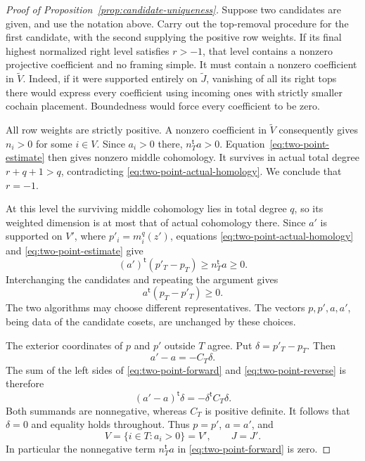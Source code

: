 \begin{proof}[Proof of Proposition~\ref{prop:candidate-uniqueness}]
Suppose two candidates are given, and use the notation above.  Carry
out the top-removal procedure for the first candidate, with the
second supplying the positive row weights.  If its final highest
normalized right level satisfies \(r>-1\), that level contains a
nonzero projective coefficient and no framing simple.  It must
contain a nonzero coefficient in \(\widetilde V\).  Indeed, if it
were supported entirely on \(\widetilde J\), vanishing of all its
right tops there would express every coefficient using incoming
ones with strictly smaller cochain placement.  Boundedness would
force every coefficient to be zero.

All row weights are strictly positive.  A nonzero coefficient in
\(\widetilde V\) consequently gives \(n_i>0\) for some \(i\in V\).
Since \(a_i>0\) there, \(n_T^{\mathsf t}a>0\).
Equation~\eqref{eq:two-point-estimate} then gives nonzero middle
cohomology.  It survives in actual total degree \(r+q+1>q\),
contradicting \eqref{eq:two-point-actual-homology}.  We conclude that
\(r=-1\).

At this level the surviving middle cohomology lies in total degree
\(q\), so its weighted dimension is at most that of actual
cohomology there.  Since \(a'\) is supported on \(V'\), where
\(p'_i=m_i^q(z')\), equations
\eqref{eq:two-point-actual-homology} and
\eqref{eq:two-point-estimate} give
\begin{equation}
\label{eq:two-point-forward}
 (a')^{\mathsf t}(p'_T-p_T)
       \ge n_T^{\mathsf t}a\ge0.
\end{equation}
Interchanging the candidates and repeating the argument gives
\begin{equation}
\label{eq:two-point-reverse}
 a^{\mathsf t}(p_T-p'_T)\ge0.
\end{equation}
The two algorithms may choose different representatives.  The
vectors \(p,p',a,a'\), being data of the candidate cosets, are
unchanged by these choices.

The exterior coordinates of \(p\) and \(p'\) outside \(T\) agree.
Put \(\delta=p'_T-p_T\).  Then
\[
 a'-a=-C_T\delta.
\]
The sum of the left sides of \eqref{eq:two-point-forward} and
\eqref{eq:two-point-reverse} is therefore
\[
 (a'-a)^{\mathsf t}\delta
       =-\delta^{\mathsf t}C_T\delta.
\]
Both summands are nonnegative, whereas \(C_T\) is positive definite.
It follows that \(\delta=0\) and equality holds throughout.
Thus \(p=p'\), \(a=a'\), and
\[
 V=\{i\in T:a_i>0\}=V',\qquad J=J'.
\]
In particular the nonnegative term \(n_T^{\mathsf t}a\) in
\eqref{eq:two-point-forward} is zero.


\end{proof}
